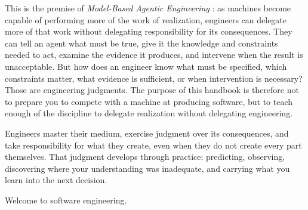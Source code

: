 This is the premise of \emph{Model-Based Agentic Engineering} \citep{davis2026mage}: as machines become
capable of performing more of the work of realization, engineers can delegate more of that work
without delegating responsibility for its consequences. They can tell an agent what must be true,
give it the knowledge and constraints needed to act, examine the evidence it produces, and
intervene when the result is unacceptable. But how does an engineer know what must be specified,
which constraints matter, what evidence is sufficient, or when intervention is necessary? Those
are engineering judgments. The purpose of this handbook is therefore not to prepare you to compete
with a machine at producing software, but to teach enough of the discipline to delegate
realization without delegating engineering.

Engineers master their medium, exercise judgment over its consequences, and take responsibility for
what they create, even when they do not create every part themselves. That judgment develops
through practice: predicting, observing, discovering where your understanding was inadequate, and
carrying what you learn into the next decision.

Welcome to software engineering.

